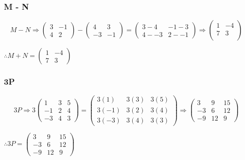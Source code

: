 \documentclass{article}
\begin{document}
\subsubsection{M - N}
\[
M - N \Rightarrow
	\begin{pmatrix}
		3 & -1\\
		4 & 2
	\end{pmatrix}
	-
	\begin{pmatrix}
		4 & 3\\
		-3 & -1
	\end{pmatrix}
	=
	\begin{pmatrix}
		3-4 & -1-3\\
		4--3 & 2--1
	\end{pmatrix}
	\Rightarrow
	\begin{pmatrix}
		1 & -4\\
		7 & 3\\
	\end{pmatrix}
\]
\begin{center}\vspace{0.5cm}$\therefore M+N=\begin{pmatrix} 1 & -4\\ 7 & 3\end{pmatrix}$\end{center}

\subsubsection{3P}
\[
	3P \Rightarrow 3
	\begin{pmatrix}
		1 & 3 & 5\\
		-1 & 2 & 4\\
		-3 & 4 & 3
	\end{pmatrix}
	=
	\begin{pmatrix}
		3(1) & 3(3) & 3(5)\\
		3(-1) & 3(2) & 3(4)\\
		3(-3) & 3(4) & 3(3)
	\end{pmatrix}
	\Rightarrow
	\begin{pmatrix}
		3 & 9 & 15\\
		-3 & 6 & 12\\
		-9 & 12 & 9
	\end{pmatrix}
\]
\begin{center}\vspace{0.5cm}$\therefore 3P=\begin{pmatrix} 3 & 9 & 15\\ -3 & 6 & 12\\ -9 & 12 & 9\end{pmatrix}$\end{center}
\end{document}
